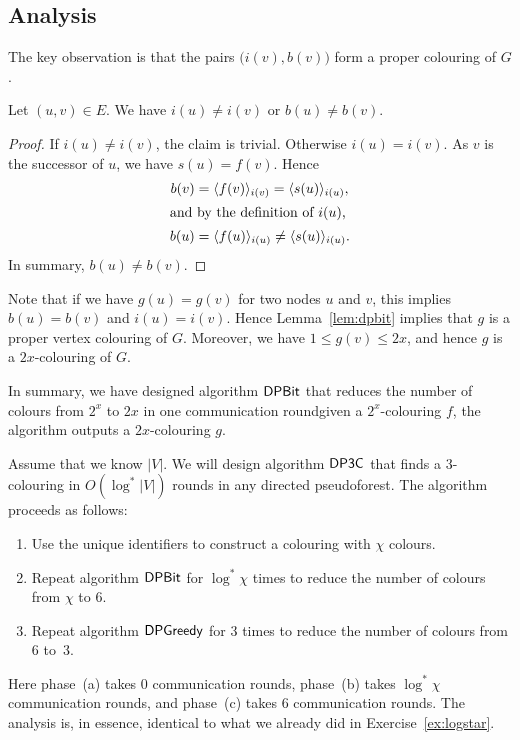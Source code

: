 \subsection{Analysis}

The key observation is that the pairs $\bigl(i(v), b(v)\bigr)$ form a proper colouring of $G$.
\begin{lemma}\label{lem:dpbit}
    Let $(u,v) \in E$. We have $i(u) \ne i(v)$ or $b(u) \ne b(v)$.
\end{lemma}
\begin{proof}
    If $i(u) \ne i(v)$, the claim is trivial. Otherwise $i(u) = i(v)$. As $v$ is the successor of $u$, we have $s(u) = f(v)$. Hence
    \begin{align*}
        b(v) &= \langle f(v) \rangle_{i(v)} = \langle s(u) \rangle_{i(u)}, \\
    \intertext{and by the definition of $i(u)$,}
        b(u) &= \langle f(u) \rangle_{i(u)} \ne \langle s(u) \rangle_{i(u)}.
    \end{align*}
    In summary, $b(u) \ne b(v)$.
\end{proof}

Note that if we have $g(u) = g(v)$ for two nodes $u$ and $v$, this implies $b(u) = b(v)$ and $i(u) = i(v)$. Hence Lemma~\ref{lem:dpbit} implies that $g$ is a proper vertex colouring of $G$. Moreover, we have $1 \le g(v) \le 2x$, and hence $g$ is a $2x$-colouring of $G$.

In summary, we have designed algorithm $\textup{\sffamily DPBit}$ that reduces the number of colours from $2^x$ to $2x$ in one communication round\mydash given a $2^x$-colouring $f$, the algorithm outputs a $2x$-colouring $g$.


\label{sec:dp3c}

Assume that we know $|V|$. We will design algorithm $\textup{\sffamily DP3C}$ that finds a $3$-colouring in $O(\log^* |V|)$ rounds in any directed pseudoforest. The algorithm proceeds as follows:
\begin{enumerate}
    \item Use the unique identifiers to construct a colouring with $\chi$ colours.
    \item Repeat algorithm $\textup{\sffamily DPBit}$ for $\log^* \chi$ times to reduce the number of colours from $\chi$ to $6$.
    \item Repeat algorithm $\textup{\sffamily DPGreedy}$ for $3$ times to reduce the number of colours from $6$ to~$3$.
\end{enumerate}
Here phase~(a) takes $0$ communication rounds, phase~(b) takes $\log^* \chi$ communication rounds, and phase~(c) takes $6$ communication rounds. The analysis is, in essence, identical to what we already did in Exercise~\ref{ex:logstar}.


